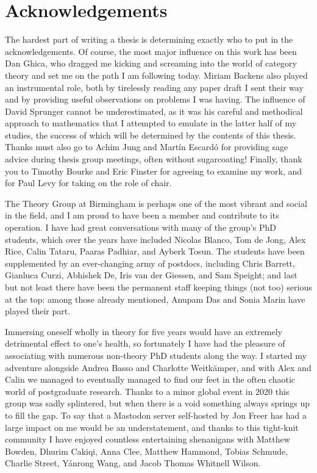 \chapter{Acknowledgements}\label{chap:acknowledgements}

The hardest part of writing a thesis is determining exactly who to put in the
acknowledgements.
Of course, the most major influence on this work has been Dan Ghica, who dragged
me kicking and screaming into the world of category theory and set me on the
path I am following today.
Miriam Backens also played an instrumental role, both by tirelessly reading
any paper draft I sent their way and by providing useful observations on
problems I was having.
The influence of David Sprunger cannot be underestimated, as it was his
careful and methodical approach to mathematics that I attempted to emulate in
the latter half of my studies, the success of which will be determined by the
contents of this thesis.
Thanks must also go to Achim Jung and Martín Escardó for providing sage advice
during thesis group meetings, often without sugarcoating!
Finally, thank you to Timothy Bourke and Eric Finster for agreeing to examine
my work, and for Paul Levy for taking on the role of chair.

The Theory Group at Birmingham is perhaps one of the most vibrant and social
in the field, and I am proud to have been a member and contribute to its
operation.
I have had great conversations with many of the group's PhD students, which over
the years have included Nicolas Blanco, Tom de Jong, Alex Rice, Calin Tataru,
Paaras Padhiar, and Ayberk Tosun.
The students have been supplemented by an ever-changing army of postdocs,
including Chris Barrett, Gianluca Curzi, Abhishek De, Iris van der Giessen, and
Sam Speight; and last but not least there have been the permanent staff keeping
things (not too) serious at the top: among those already mentioned, Anupam Das
and Sonia Marin have played their part.

Immersing oneself wholly in theory for five years would have an extremely
detrimental effect to one's health, so fortunately I have had the pleasure of
associating with numerous non-theory PhD students along the way.
I started my adventure alongside Andrea Basso and Charlotte Weitkämper, and with
Alex and Calin we managed to eventually managed to find our feet in the often
chaotic world of postgraduate research.
Thanks to a minor global event in 2020 this group was sadly splintered, but when
there is a void something always springs up to fill the gap.
To say that a Mastodon server self-hosted by Jon Freer has had a large impact on
me would be an understatement, and thanks to this tight-knit community I have
enjoyed countless entertaining shenanigans with Matthew Bowden, Dhurim Cakiqi,
Anna Clee, Matthew Hammond, Tobias Schmude, Charlie Street, Yánrong Wang, and
Jacob Thomas Whitnell Wilson.

